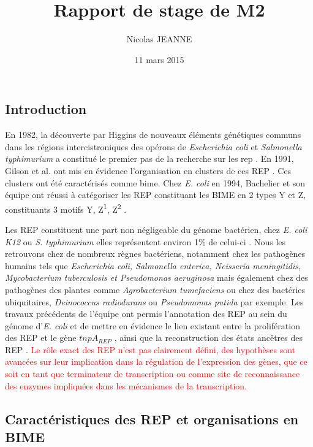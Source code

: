\documentclass[12pt,a4paper]{report}
\author{Nicolas JEANNE}
\title{Rapport de stage de M2}
\date{11 mars 2015}
\begin{document}
\maketitle

\begin{onehalfspace}
\chapter*{Introduction}
En 1982, la découverte par Higgins de nouveaux éléments génétiques communs dans les régions intercistroniques des opérons de \textit{Escherichia coli} et \textit{Salmonella typhimurium} a constitué le premier pas de la recherche sur les \gls{rep} \citep{Higgins1982}. En 1991, Gilson et al. ont mis en évidence l'organisation en clusters de ces REP \citep{Gilson1991}. Ces clusters ont été caractérisés comme \gls{bime}. Chez \textit{E. coli} en 1994, Bachelier et son équipe ont réussi à catégoriser les REP constituant les BIME en 2 types Y et Z, constituants 3 motifs Y, Z\textsuperscript{1}, Z\textsuperscript{2}  \citep{Bachellier1994}.
 
Les REP constituent une part non négligeable du génome bactérien, chez \textit{E. coli K12} ou \textit{S. typhimurium} elles représentent environ 1\% de celui-ci \citep{Gilson1991}. Nous les retrouvons chez de nombreux règnes bactériens, notamment chez les pathogènes humains tels que \textit{Escherichia coli, Salmonella enterica, Neisseria meningitidis, Mycobacterium tuberculosis et Pseudomonas aeruginosa} mais également chez des pathogènes des plantes comme \textit{Agrobacterium tumefaciens} ou chez des bactéries ubiquitaires, \textit{Deinococcus radiodurans} ou \textit{Pseudomonas putida} par exemple. Les travaux précédents de l'équipe ont permis l'annotation des REP au sein du génome d'\textit{E. coli} et de mettre en évidence le lien existant entre la prolifération des REP et le gène $tnpA_{REP}$ \citep{Weyder2013,Bosc2014}, ainsi que la reconstruction des états ancêtres des REP \citep{Bosc2014}.  \textcolor{red}{Le rôle exact des REP n'est pas clairement défini, des hypothèses sont avancées sur leur implication dans la régulation de l'expression des gènes, que ce soit en tant que terminateur de transcription ou comme site de reconnaissance des enzymes impliquées dans les mécanismes de la transcription.}

\section*{Caractéristiques des REP et organisations en BIME}


\end{onehalfspace}
\end{document}
